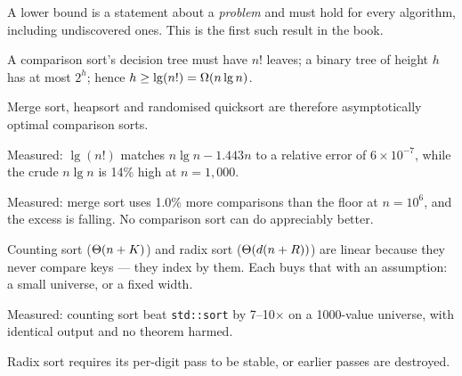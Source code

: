 \begin{chaptersummary}
\begin{tight}
  \item A lower bound is a statement about a \emph{problem} and must hold for
        every algorithm, including undiscovered ones. This is the first such
        result in the book.
  \item A comparison sort's decision tree must have $n!$ leaves; a binary tree
        of height $h$ has at most $2^{h}$; hence $h \ge \operatorname{lg}(n!) =
        \Omega(n\operatorname{lg} n)$.
  \item Merge sort, heapsort and randomised quicksort are therefore
        asymptotically optimal comparison sorts.
  \item Measured: $\lg(n!)$ matches $n\lg n - 1.443n$ to a relative error of
        $6\times10^{-7}$, while the crude $n \lg n$ is 14\% high at
        $n = 1{,}000$.
  \item Measured: merge sort uses 1.0\% more comparisons than the floor at
        $n = 10^{6}$, and the excess is falling. No comparison sort can do
        appreciably better.
  \item Counting sort ($\Theta(n+K)$) and radix sort ($\Theta(d(n+R))$) are
        linear because they never compare keys --- they index by them. Each
        buys that with an assumption: a small universe, or a fixed width.
  \item Measured: counting sort beat \texttt{std::sort} by 7--10$\times$ on a
        1000-value universe, with identical output and no theorem harmed.
  \item Radix sort requires its per-digit pass to be stable, or earlier passes
        are destroyed.
\end{tight}
\end{chaptersummary}

